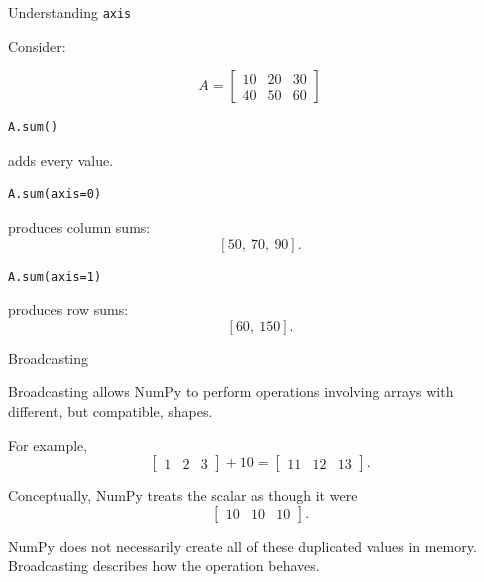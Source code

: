 \documentclass[11pt,aspectratio=43]{beamer}
\begin{document}
\begin{frame}[fragile]{Understanding \texttt{axis}}

Consider:

\[
A =
\begin{bmatrix}
10 & 20 & 30\\
40 & 50 & 60
\end{bmatrix}
\]

\begin{lstlisting}
A.sum()
\end{lstlisting}

adds every value.

\pause

\begin{lstlisting}
A.sum(axis=0)
\end{lstlisting}

produces column sums:
\[
[50,\ 70,\ 90].
\]

\pause

\begin{lstlisting}
A.sum(axis=1)
\end{lstlisting}

produces row sums:
\[
[60,\ 150].
\]

\end{frame}

\begin{frame}{Broadcasting}

Broadcasting allows NumPy to perform operations involving
arrays with different, but compatible, shapes.

For example,
\[
\begin{bmatrix}
1 & 2 & 3
\end{bmatrix}
+
10
=
\begin{bmatrix}
11 & 12 & 13
\end{bmatrix}.
\]

Conceptually, NumPy treats the scalar as though it were
\[
\begin{bmatrix}
10 & 10 & 10
\end{bmatrix}.
\]

\begin{block}{}
NumPy does not necessarily create all of these duplicated values
in memory. Broadcasting describes how the operation behaves.
\end{block}

\end{frame}
\end{document}
